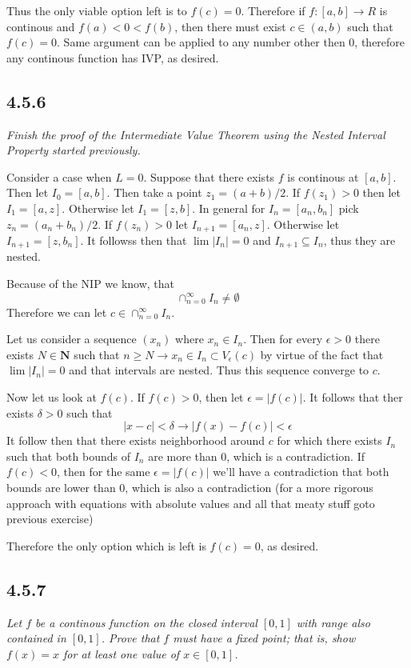 \documentclass[11pt,oneside,titlepage]{book}
\begin{document}
Thus the only viable option left is to $f(c) = 0$. Therefore if
$f: [a, b] \to R$ is continous and $f(a) < 0 < f(b)$, then there
must exist $c \in (a, b)$ such that $f(c) = 0$. Same argument can be
applied to any number other then $0$, therefore any continous
function has IVP, as desired.


\subsection*{4.5.6}
\textit{Finish the proof of the Intermediate Value Theorem using the Nested Interval Property started previously.}

Consider a case when $L = 0$. 
Suppose that there exists $f$ is continous at $[a, b]$. Then let
$I_0 = [a, b]$. Then take a point $z_1 = (a + b)/2$. If $f(z_1) > 0$ then
let $I_1 = [a, z]$. Otherwise let $I_1 = [z, b]$. In general for
$I_n = [a_n, b_n]$ pick $z_n = (a_n + b_n) / 2$. If $f(z_n) > 0$
let $I_{n + 1} = [a_n, z]$. Otherwise let $I_{n + 1} = [z, b_n]$.
It followss then that $\lim |I_n| = 0$ and $I_{n + 1} \subseteq I_n$, thus
they are nested.

Because of the NIP we know, that
$$\cap_{n = 0}^{\infty} I_n \neq \emptyset$$
Therefore we can let $c \in \cap_{n = 0}^{\infty} I_n$.

Let us consider a sequence $(x_n)$ where $x_n \in I_n$. Then
for every $\epsilon > 0$ there exists $N \in \textbf{N}$  such that
$n \geq N \to
x_n \in I_n \subset V_\epsilon(c)$ by virtue of the fact that
$\lim|I_n| = 0$ and that intervals are nested. Thus this sequence converge to $c$.

Now let us look at $f(c)$. If $f(c) > 0$, then let $\epsilon = |f(c)|$.
It follows that ther exists $\delta> 0$ such that
$$|x - c| < \delta \to |f(x) - f(c)| < \epsilon$$
It follow then that there exists neighborhood around $c$ for which
there exists $I_n$ such that both bounds of $I_n$ are more than $0$, which
is a contradiction.
If $f(c) < 0$, then for the same $\epsilon = |f(c)|$ we'll have a contradiction
that both bounds are lower than $0$, which is also a contradiction (for a more
rigorous approach with equations with absolute values and all that
meaty stuff goto previous exercise)

Therefore the only option which is left is $f(c) = 0$, as desired. 

\subsection*{4.5.7}
\textit{Let $f$ be a continous function on the closed interval $[0, 1]$ with
  range also contained in $[0, 1]$. Prove that $f$ must have a fixed point;
  that is, show $f(x) = x$ for at least one value of $x \in [0, 1]$.}
\end{document}
